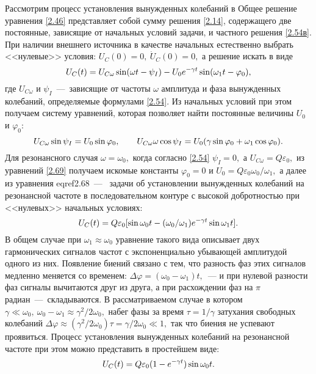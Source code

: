Рассмотрим процесс установления вынужденных колебаний в  Общее решение уравнения \eqref{2.46} представляет собой сумму решения \eqref{2.14}, содержащего две постоянные, зависящие от начальных условий задачи, и частного решения \eqref{2.54в}. При наличии внешнего источника в качестве начальных естественно выбрать <<нулевые>> условия: $U_C(0)=0,~\dot U_C(0)=0,$ а решение искать в виде
\begin{equation}
	\eqmark{2.68}
	U_C(t)=U_{C\omega}\sin(\omega t-\psi_I)-U_0e^{-\gamma t}\sin(\omega_1t-\varphi_0),
\end{equation}
где $U_{C\omega}$ и $\psi_I$~---~зависящие от частоты $\omega$ амплитуда и фаза вынужденных колебаний, определяемые формулами \eqref{2.54}. Из начальных условий при этом получаем систему уравнений, которая позволяет найти постоянные величины $U_0$ и $\varphi_0:$
\begin{equation}
	\eqmark{2.69}
	U_{C\omega}\sin\psi_I=U_0\sin\varphi_0, \qquad U_{C\omega}\omega\cos\psi_I=U_0(\gamma\sin\varphi_0+\omega_1\cos\varphi_0).
\end{equation}
Для резонансного случая $\omega=\omega_0,$ когда согласно \eqref{2.54} $\psi_I=0,$ а $U_{C\omega}=Q\varepsilon_0,$ из уравнений \eqref{2.69} получаем искомые константы $\varphi_0=0$ и $U_0=Q\varepsilon_0\omega_0/\omega_1,$ а далее из уравнения eqref{2.68}~---~ задачи об установлении вынужденных колебаний на резонансной частоте в последовательном контуре с высокой добротностью при <<нулевых>> начальных условиях:
\begin{equation}
	\eqmark{2.70}
	U_{C}(t)=Q\varepsilon_0[\sin\omega_0t-(\omega_0/\omega_1)e^{-\gamma t}\sin\omega_1 t].
\end{equation}
В общем случае при $\omega_1\approx\omega_0$ уравнение такого вида описывает  двух гармонических сигналов  частот с экспоненциально убывающей амплитудой одного из них. Появление биений связано с тем, что разность фаз этих сигналов медленно меняется со временем: 
$\Delta\varphi=(\omega_0-\omega_1)t,$~--- и при нулевой разности фаз сигналы вычитаются друг из друга, а при расхождении фаз на $\pi$ радиан~---~складываются. В рассматриваемом случае  в котором $\gamma\ll\omega_0,~\omega_0-\omega_1\approx\gamma^2/2\omega_0,$ набег фазы за время $\tau=1/\gamma$ затухания свободных колебаний $\Delta\varphi\approx(\gamma^2/2\omega_0)\tau=\gamma/2\omega_0\ll1,$  так что биения не успевают проявиться. Процесс установления вынужденных колебаний на резонансной частоте при этом можно представить в простейшем виде:
\begin{equation}\eqmark{2.71}
	U_C(t)=Q\varepsilon_0(1-e^{-\gamma t})\sin\omega_0 t.
\end{equation}

